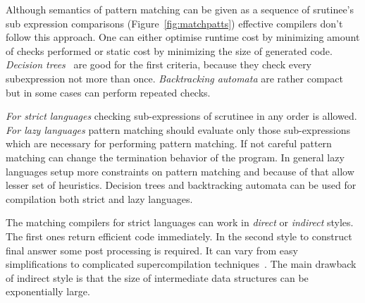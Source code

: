 \begin{comment}
\begin{figure}[ht]
\begin{minipage}[b]{0.3\linewidth}
\centering
\label{fig:figure1}
\end{minipage}
\hspace{0.5cm}
\begin{minipage}[b]{0.3\linewidth}
\centering
\begin{lstlisting}
switch x with 
| true -> 
    switch y with 
    | true -> 
       switch z with 
       | true -> 4
       | _ -> 3
    | _ -> 
      switch z with 
      | true -> 1
      | _ -> 3 
| _ -> 
   switch y with 
   | true -> 2 
   | _ -> if z then 1 else 3
\end{lstlisting}
\end{minipage}
\hspace{0.5cm}
\begin{minipage}[b]{0.3\linewidth}
\centering
\end{minipage}
\end{figure}
\end{comment}


Although semantics of pattern matching can be given as a sequence of srutinee's sub expression comparisons (Figure~\ref{fig:matchpatts}) effective compilers don't follow
this approach. One can either optimise runtime cost by minimizing amount of checks performed or static cost by minimizing the size of generated code. \emph{Decision trees}~\cite{?}
are good for the first criteria, because they check every subexpression not more than once. \emph{Backtracking automata} are rather compact but in some cases can perform
repeated checks.

\emph{For strict languages} checking sub-expressions of scrutinee in any order is allowed. \emph{For lazy languages} pattern matching should evaluate only those sub-expressions which are
necessary for performing pattern matching. If not careful pattern matching can change the termination behavior of the program. In general lazy languages setup more constraints on pattern matching and because of that allow lesser set of heuristics. Decision trees and backtracking automata can be used for compilation both  strict and lazy languages.

The matching compilers for strict languages can work in \emph{direct} or \emph{indirect} styles. The first ones return efficient code immediately. In the second style to
construct final answer some post processing is required. It can vary from easy simplifications to complicated supercompilation techniques~\cite{sestoft1996}. The main
drawback of indirect style is that the size of intermediate data structures can be exponentially large.

